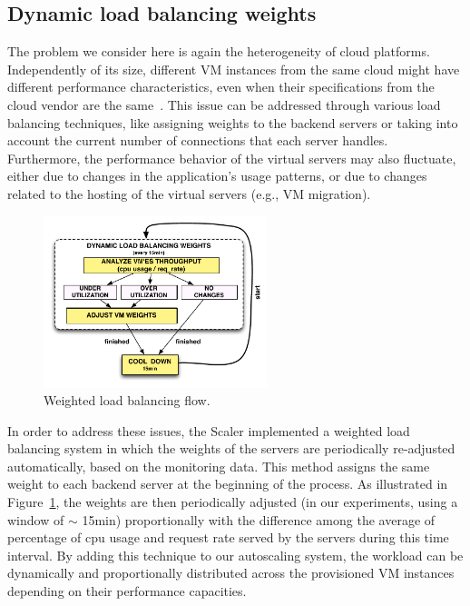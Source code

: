 


\subsection{Dynamic load balancing weights } 


The problem we consider here is again the heterogeneity of cloud platforms.
Independently of its size, different VM instances from the same cloud might have different performance
characteristics, even when their specifications from the cloud vendor are 
the same~\cite{ec2Performance}. This issue can be addressed through various 
load balancing techniques, like assigning weights to the backend servers or 
taking into account the current number of connections that each server 
handles. Furthermore, the performance behavior of the virtual servers may 
also fluctuate, either due to changes in the application's usage 
patterns, or due to changes related to the hosting of the virtual servers 
(e.g., VM migration).


\begin{figure}[htb]
  \begin{center}
    \includegraphics[height=5cm]{images/load_balancing}
  \end{center}
\vspace{-5mm}
  \caption{Weighted load balancing flow.}
  \label{fig:load_balancing}
\end{figure}


In order to address these issues, the Scaler implemented a weighted 
load balancing system in which the weights of the servers are 
periodically re-adjusted automatically, based on the monitoring data.  
This method assigns the same weight to each backend server at the 
beginning of the process. As illustrated in Figure~\ref{fig:load_balancing}, the weights are then periodically
adjusted (in our experiments, using a window of $\sim$ 15min) proportionally 
with the difference among the average of percentage of cpu usage and request rate served by the servers 
during this time interval. By adding this technique to our autoscaling system, 
the workload can be dynamically and proportionally distributed across the provisioned VM instances depending on their performance capacities.




